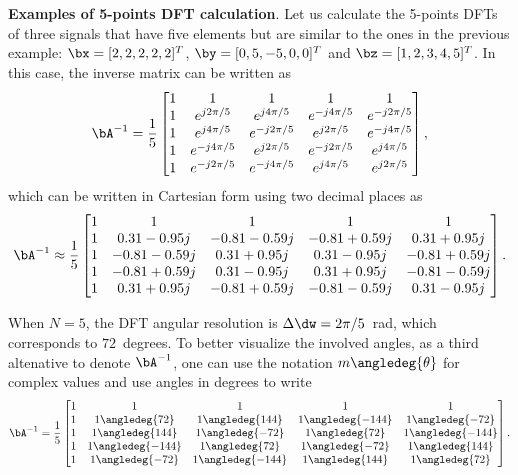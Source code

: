 \bExample \textbf{Examples of 5-points DFT calculation}.
\label{ex:five_points_dft}
Let us calculate the 5-points DFTs of three signals that have five elements but are similar to the ones in the previous example: $\bx = [2, 2, 2, 2, 2]^T$, $\by = [0, 5, -5, 0, 0]^T$ and $\bz = [1,2,3,4,5]^T$.
In this case, the inverse matrix can be written as
\[
\bA^{-1} = \frac{1}{5}
    \begin{bmatrix}
    1 & 1 & 1 & 1 & 1\\
    1 & e^{j 2\pi / 5}  & e^{j 4\pi / 5} & e^{-j 4\pi / 5} & e^{-j 2\pi / 5} \\
    1 & e^{j 4\pi / 5}  & e^{-j 2\pi / 5} & e^{j 2\pi / 5} & e^{-j 4\pi / 5} \\
    1 & e^{-j 4\pi / 5} & e^{j 2\pi / 5} & e^{-j 2\pi / 5} & e^{j 4\pi / 5} \\
    1 & e^{-j 2\pi / 5} & e^{-j 4\pi / 5} & e^{j 4\pi / 5} & e^{j 2\pi / 5} \\
    \end{bmatrix},
\]
which can be written in Cartesian form using two decimal places as
\[
\bA^{-1} \approx \frac{1}{5}
    \begin{bmatrix}
    1 & 1 & 1 & 1 & 1\\
    1 & 0.31-0.95j & -0.81-0.59j & -0.81+0.59j & 0.31 + 0.95j \\
    1 & -0.81-0.59j & 0.31 + 0.95j & 0.31-0.95j & -0.81 + 0.59j \\
    1 & -0.81+0.59j & 0.31 - 0.95j & 0.31+0.95j & -0.81 -0.59j \\
    1 & 0.31+0.95j & -0.81+0.59j & -0.81-0.59j & 0.31 -0.95j \\
    \end{bmatrix}.
\]
		
When $N=5$, the DFT angular resolution is $\Delta \dw = 2\pi/5$~rad, which corresponds to $72$~degrees. To better visualize
the involved angles, as a third altenative to denote $\bA^{-1}$, one can
use the notation $m \angledeg{\theta}$ for complex values and use angles in degrees to write
\[
\bA^{-1} = \frac{1}{5}
    \begin{bmatrix}
    1 & 1 & 1 & 1 & 1\\
    1 & 1\angledeg{72} & 1\angledeg{144} & 1\angledeg{-144} & 1\angledeg{-72} \\
    1 & 1\angledeg{144} & 1\angledeg{-72} & 1\angledeg{72} & 1\angledeg{-144} \\
    1 & 1\angledeg{-144} & 1\angledeg{72} & 1\angledeg{-72} & 1\angledeg{144} \\
    1 & 1\angledeg{-72} & 1\angledeg{-144} & 1\angledeg{144} & 1\angledeg{72} \\
    \end{bmatrix}.
\]

